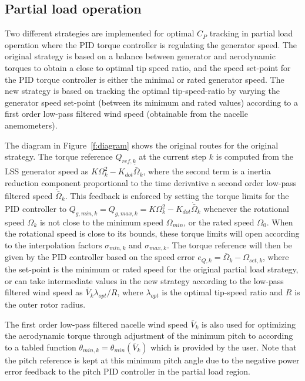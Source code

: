 \subsection{Partial load operation}

Two different strategies are implemented for optimal $C_P$ tracking in partial load operation where the PID torque controller is regulating the generator speed. The original strategy is based on a balance between generator and aerodynamic torques to obtain a close to optimal tip speed ratio, and the speed set-point for the PID torque controller is either the minimal or rated generator speed. The new strategy is based on tracking the optimal tip-speed-ratio by varying the generator speed set-point (between its minimum and rated values) according to a first order low-pass filtered wind speed (obtainable from the nacelle anemometers). 

The diagram in Figure~\ref{f:diagram} shows the original routes for the original strategy. The torque reference $Q_{ref,k}$ at the current step $k$ is computed from the LSS generator speed as $K \Omega_k^2 - K_{dot} \dot{\bar \Omega}_k$, where the second term is a inertia reduction component proportional to the time derivative a second order low-pass filtered speed $\dot{\bar \Omega}_k$. This feedback is enforced by setting the torque limits for the PID controller to $Q_{g,min,k}=Q_{g,max,k}=K\Omega_k^2 - K_{dot} \dot{\bar \Omega}_k$ whenever the rotational speed $\Omega_k$ is not close to the minimum speed $\Omega_{min}$, or the rated speed $\Omega_0$. When the rotational speed is close to its bounds, these torque limits will open according to the interpolation factors $\sigma_{min,k}$ and $\sigma_{max,k}$. The torque reference will then be given by the PID controller based on the speed error $e_{Q,k}=\bar\Omega_k -\Omega_{set,k}$, where the set-point is the minimum or rated speed for the original partial load strategy, or can take intermediate values in the new strategy according to the low-pass filtered wind speed as $\bar V_k \lambda_{opt}/R$, where $\lambda_{opt}$ is the optimal tip-speed ratio and $R$ is the outer rotor radius. 

The first order low-pass filtered nacelle wind speed $\bar V_k$ is also used for optimizing the aerodynamic torque through adjustment of the minimum pitch to according to a tabled function $\theta_{min,k}=\theta_{min}(\bar V_k)$ which is provided by the user. Note that the pitch reference is kept at this minimum pitch angle due to the negative power error feedback to the pitch PID controller in the partial load region.

